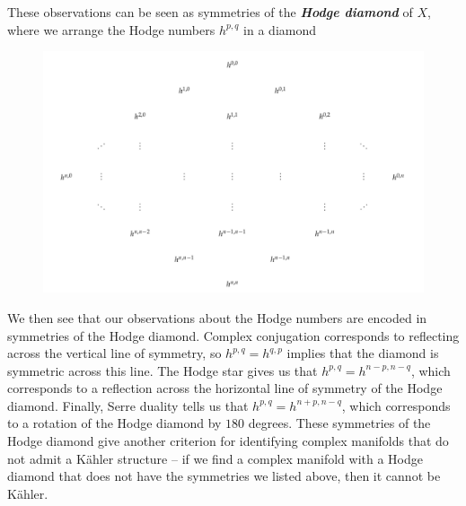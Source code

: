 \documentclass[psamsfonts, 12pt]{amsart}
\theoremstyle{definition}
\theoremstyle{remark}
\newcommand{\ib}[1]{\textbf{\textit{#1}}}
\begin{document}
These observations can be seen as symmetries of the \ib{Hodge diamond} of $X$, where
we arrange the Hodge numbers $h^{p,q}$ in a diamond
\begin{figure}[H]
\includegraphics[width=\textwidth]{HodgeDiamond}
\end{figure}

We then see that our observations about the Hodge numbers are encoded in symmetries
of the Hodge diamond. Complex conjugation corresponds to  reflecting across the
vertical line of symmetry, so $h^{p,q} = h^{q,p}$ implies that the diamond is
symmetric across this line. The Hodge star gives us that $h^{p,q} = h^{n-p,n-q}$,
which corresponds to a reflection across the horizontal line of symmetry of the Hodge
diamond. Finally, Serre duality tells us that $h^{p,q} = h^{n+p,n-q}$, which
corresponds to a rotation of the Hodge diamond by $180$ degrees. These symmetries of
the Hodge diamond give another criterion for identifying complex
manifolds that do not admit a K\"ahler structure -- if we find a complex manifold
with a Hodge diamond that does not have the symmetries we listed above, then it cannot
be K\"ahler.
%
\end{document}
